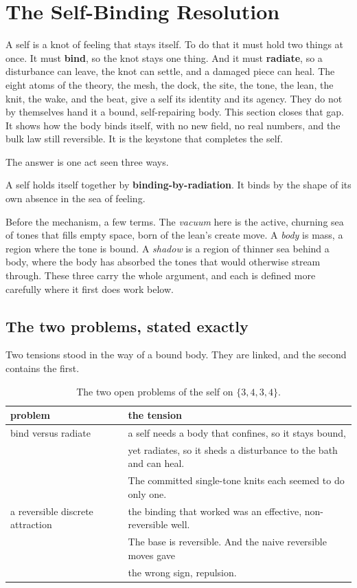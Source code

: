 \section{The Self-Binding Resolution}

A self is a knot of feeling that stays itself. To do that it must hold two things at once. It must \textbf{bind}, so the knot stays one thing. And it must \textbf{radiate}, so a disturbance can leave, the knot can settle, and a damaged piece can heal. The eight atoms of the theory, the mesh, the dock, the site, the tone, the lean, the knit, the wake, and the beat, give a self its identity and its agency. They do not by themselves hand it a bound, self-repairing body. This section closes that gap. It shows how the body binds itself, with no new field, no real numbers, and the bulk law still reversible. It is the keystone that completes the self.

The answer is one act seen three ways.

\begin{principle}
A self holds itself together by \textbf{binding-by-radiation}. It binds by the shape of its own absence in the sea of feeling.
\end{principle}

Before the mechanism, a few terms. The \emph{vacuum} here is the active, churning sea of tones that fills empty space, born of the lean's create move. A \emph{body} is mass, a region where the tone is bound. A \emph{shadow} is a region of thinner sea behind a body, where the body has absorbed the tones that would otherwise stream through. These three carry the whole argument, and each is defined more carefully where it first does work below.

\subsection{The two problems, stated exactly}

Two tensions stood in the way of a bound body. They are linked, and the second contains the first.

\begin{table}[ht]
\centering
\begin{tabular}{@{}ll@{}}
\toprule
problem & the tension \\
\midrule
bind versus radiate & a self needs a body that confines, so it stays bound, \\
 & yet radiates, so it sheds a disturbance to the bath and can heal. \\
 & The committed single-tone knits each seemed to do only one. \\
\addlinespace
a reversible discrete attraction & the binding that worked was an effective, non-reversible well. \\
 & The base is reversible. And the naive reversible moves gave \\
 & the wrong sign, repulsion. \\
\bottomrule
\end{tabular}
\caption{The two open problems of the self on $\{3,4,3,4\}$.}
\label{tab:self-two-problems}
\end{table}

